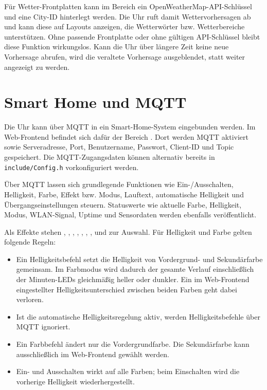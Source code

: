 \documentclass[12pt,a4paper, german,oneside, headinclude, headsepline,plainheadsepline,BCOR20mm, DIV18,parskip=half, openright, numbers=noenddot, captions=tableheading,version=first,listof=totoc,version=first]{scrbook}
\begin{document}
Für Wetter-Frontplatten kann im Bereich  ein OpenWeatherMap-API-Schlüssel und eine City-ID hinterlegt werden. Die Uhr ruft damit Wettervorhersagen ab und kann diese auf Layouts anzeigen, die Wetterwörter bzw. Wetterbereiche unterstützen. Ohne passende Frontplatte oder ohne gültigen API-Schlüssel bleibt diese Funktion wirkungslos. Kann die Uhr über längere Zeit keine neue Vorhersage abrufen, wird die veraltete Vorhersage ausgeblendet, statt weiter angezeigt zu werden.

\section{Smart Home und MQTT}

Die Uhr kann über MQTT in ein Smart-Home-System eingebunden werden. Im Web-Frontend befindet sich dafür der Bereich . Dort werden MQTT aktiviert sowie Serveradresse, Port, Benutzername, Passwort, Client-ID und Topic gespeichert. Die MQTT-Zugangsdaten können alternativ bereits in \texttt{include/Config.h} vorkonfiguriert werden.

Über MQTT lassen sich grundlegende Funktionen wie Ein-/Ausschalten, Helligkeit, Farbe, Effekt bzw. Modus, Lauftext, automatische Helligkeit und Übergangseinstellungen steuern. Statuswerte wie aktuelle Farbe, Helligkeit, Modus, WLAN-Signal, Uptime und Sensordaten werden ebenfalls veröffentlicht.

Als Effekte stehen , , , , , , ,  und  zur Auswahl. Für Helligkeit und Farbe gelten folgende Regeln:

\begin{itemize}
    \item Ein Helligkeitsbefehl setzt die Helligkeit von Vordergrund- und Sekundärfarbe gemeinsam. Im Farbmodus  wird dadurch der gesamte Verlauf einschließlich der Minuten-LEDs gleichmäßig heller oder dunkler. Ein im Web-Frontend eingestellter Helligkeitsunterschied zwischen beiden Farben geht dabei verloren.
    \item Ist die automatische Helligkeitsregelung aktiv, werden Helligkeitsbefehle über MQTT ignoriert.
    \item Ein Farbbefehl ändert nur die Vordergrundfarbe. Die Sekundärfarbe kann ausschließlich im Web-Frontend gewählt werden.
    \item Ein- und Ausschalten wirkt auf alle Farben; beim Einschalten wird die vorherige Helligkeit wiederhergestellt.
\end{itemize}
\end{document}
